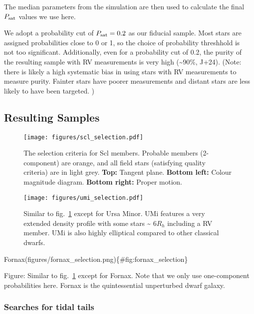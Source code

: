 The median parameters from the simulation are then used to calculate the
final \(P_{\rm sat}\) values we use here.

We adopt a probability cut of \(P_{\rm sat} = 0.2\) as our fiducial
sample. Most stars are assigned probabilities close to 0 or 1, so the
choice of probability threshhold is not too significant. Additionally,
even for a probability cut of 0.2, the purity of the resulting sample
with RV measurements is very high (\textasciitilde90\%, J+24). (Note:
there is likely a high systematic bias in using stars with RV
measurements to measure purity. Fainter stars have poorer measurements
and distant stars are less likely to have been targeted. )

\subsection{Resulting Samples}\label{resulting-samples}

\begin{figure}
\centering
\texttt{[image: figures/scl\_selection.pdf]}
\caption[Sculptor selection criteria]{The selection criteria for Scl
members. Probable members (2-component) are orange, and all field stars
(satisfying quality criteria) are in light grey. \textbf{Top:} Tangent
plane. \textbf{Bottom left:} Colour magnitude diagram. \textbf{Bottom
right:} Proper motion.}\label{fig:sculptor_selection}
\end{figure}

\begin{figure}
\centering
\texttt{[image: figures/umi\_selection.pdf]}
\caption[Ursa Minor Selection]{Similar to
fig.~\ref{fig:sculptor_selection} except for Ursa Minor. UMi features a
very extended density profile with some stars \textasciitilde{} 6\(R_h\)
including a RV member. UMi is also highly elliptical compared to other
classical dwarfs.}\label{fig:umi_selection}
\end{figure}

Fornax(figures/fornax\_selection.png)\{\#fig:fornax\_selection\}

Figure: Similar to fig.~\ref{fig:sculptor_selection} except for Fornax.
Note that we only use one-component probabilities here. Fornax is the
quintessential unperturbed dwarf galaxy.

\subsubsection{Searches for tidal tails}\label{searches-for-tidal-tails}


